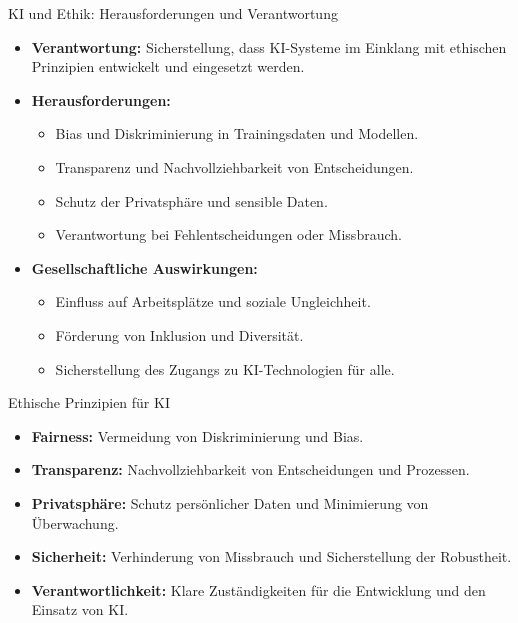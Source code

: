 \documentclass[aspectratio=1610, xcolor=dvipsnames, 9pt]{beamer}
\begin{document}
\begin{frame}{KI und Ethik: Herausforderungen und Verantwortung}
  \begin{itemize}
    \item \textbf{Verantwortung:}
     Sicherstellung, dass KI-Systeme im Einklang mit ethischen Prinzipien entwickelt und eingesetzt werden.
    \item \textbf{Herausforderungen:}
      \begin{itemize}
        \item Bias und Diskriminierung in Trainingsdaten und Modellen.
        \item Transparenz und Nachvollziehbarkeit von Entscheidungen.
        \item Schutz der Privatsphäre und sensible Daten.
        \item Verantwortung bei Fehlentscheidungen oder Missbrauch.
      \end{itemize}
    \item \textbf{Gesellschaftliche Auswirkungen:}
      \begin{itemize}
        \item Einfluss auf Arbeitsplätze und soziale Ungleichheit.
        \item Förderung von Inklusion und Diversität.
        \item Sicherstellung des Zugangs zu KI-Technologien für alle.
      \end{itemize}
  \end{itemize}
\end{frame}

\begin{frame}{Ethische Prinzipien für KI}
  \begin{itemize}
    \item \textbf{Fairness:} Vermeidung von Diskriminierung und Bias. \\
    \item \textbf{Transparenz:} Nachvollziehbarkeit von Entscheidungen und Prozessen. \\
    \item \textbf{Privatsphäre:} Schutz persönlicher Daten und Minimierung von Überwachung. \\
    \item \textbf{Sicherheit:} Verhinderung von Missbrauch und Sicherstellung der Robustheit. \\
    \item \textbf{Verantwortlichkeit:} Klare Zuständigkeiten für die Entwicklung und den Einsatz von KI.
  \end{itemize}
\end{frame}
\end{document}
